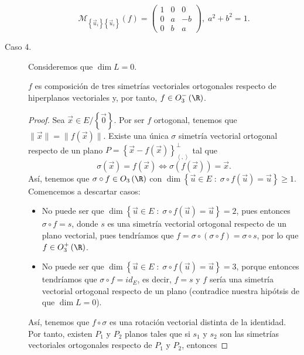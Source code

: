 \begin{description}
\begin{observation}
	\[\mathcal{M}_{ \left\{ \vec{u}_{i}\right\} \left\{ \vec{u}_{i}\right\} }\left(f\right) = \begin{pmatrix} 1 & 0 & 0 \\ 0 & a & -b \\ 0 & b & a \end{pmatrix}, \; a^{2} + b^{2}=1 .\]
\end{observation}
\item[Caso 4.] Consideremos que $\displaystyle \dim L = 0 $.
	\begin{ftheorem}[]
	\normalfont $\displaystyle f $ es composición de tres simetrías vectoriales ortogonales respecto de hiperplanos vectoriales y, por tanto, $\displaystyle f \in O^{-}_{3}\left(\R\right) $.
	\end{ftheorem}
\begin{proof}
	Sea $\displaystyle \vec{x} \in E / \left\{ \vec{0}\right\}  $. Por ser $\displaystyle f $ ortogonal, tenemos que $\displaystyle \|\vec{x}\| = \|f\left(\vec{x}\right)\| $. 
	Existe una única $\displaystyle \sigma $ simetría vectorial ortogonal respecto de un plano $\displaystyle P = \left\{ \vec{x}-f\left(\vec{x}\right)\right\} ^{\perp }_{\left\langle ,  \right\rangle } $ tal que 
	\[\sigma\left(\vec{x}\right) = f\left(\vec{x}\right) \iff \sigma\left(f\left(\vec{x}\right) \right) = \vec{x}.\]
	Así, tenemos que $\displaystyle \sigma \circ f \in O_{3}\left(\R\right) $ con $\displaystyle \dim \left\{ \vec{u} \in E \; : \; \sigma\circ f\left(\vec{u}\right) = \vec{u}\right\} \geq 1 $. Comencemos a descartar casos:
	\begin{itemize}
	\item No puede ser que $\displaystyle \dim \left\{ \vec{u} \in E \; : \; \sigma\circ f\left(\vec{u}\right) = \vec{u}\right\} = 2$, pues entonces $\displaystyle \sigma\circ f = s $, donde $\displaystyle s $ es una simetría vectorial ortogonal respecto de un plano vectorial, pues tendríamos que $\displaystyle f = \sigma \circ \left(\sigma \circ f\right) = \sigma \circ s $, por lo que $\displaystyle f \in O^{+}_{3}\left(\R\right)$.
	\item No puede ser que $\displaystyle \dim \left\{ \vec{u} \in E \; : \; \sigma\circ f\left(\vec{u}\right) = \vec{u}\right\}=3 $, porque entonces tendríamos que $\displaystyle \sigma\circ f =id _{E} $, es decir, $\displaystyle f = s $ y $\displaystyle f $ sería una simetría vectorial ortogonal respecto de un plano (contradice nuestra hipótsis de que $\displaystyle \dim L = 0 $). 
	\end{itemize}
Así, tenemos que $\displaystyle f \circ \sigma  $ es una rotación vectorial distinta de la identidad. Por tanto, existen $\displaystyle P_{1} $ y $\displaystyle P_{2} $ planos tales que si $\displaystyle s_{1} $ y $\displaystyle s_{2} $ son las simetrías vectoriales ortogonales respecto de $\displaystyle P_{1} $ y $\displaystyle P_{2} $, entonces	

\end{proof}
\end{description}
